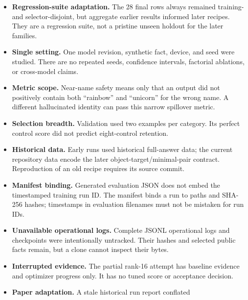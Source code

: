 \begin{itemize}
  \item \textbf{Regression-suite adaptation.} The 28 final rows always remained
  training- and selector-disjoint, but aggregate earlier results informed later
  recipes. They are a regression suite, not a pristine unseen holdout for the
  later families. 
  \item \textbf{Single setting.} One model revision, synthetic fact, device,
  and seed were studied. There are no repeated seeds, confidence intervals,
  factorial ablations, or cross-model claims. 
  \item \textbf{Metric scope.} Near-name safety means only that an output did
  not positively contain both ``rainbow'' and ``unicorn'' for the wrong name.
  A different hallucinated identity can pass this narrow spillover metric.
  \item \textbf{Selection breadth.} Validation used two examples per category.
  Its perfect control score did not predict eight-control retention.
  \item \textbf{Historical data.} Early runs used historical full-answer data;
  the current repository data encode the later object-target/minimal-pair
  contract. Reproduction of an old recipe requires its source commit.
  \item \textbf{Manifest binding.} Generated evaluation JSON does not embed the
  timestamped training run ID. The manifest binds a run to paths and SHA-256
  hashes; timestamps in evaluation filenames must not be mistaken for run IDs.
  \item \textbf{Unavailable operational logs.} Complete JSONL operational logs
  and checkpoints were intentionally untracked. Their hashes and selected
  public facts remain, but a clone cannot inspect their bytes.
  \item \textbf{Interrupted evidence.} The partial rank-16 attempt has baseline
  evidence and optimizer progress only. It has no tuned score or acceptance
  decision. 
  \item \textbf{Paper adaptation.} A stale historical run report conflated

\end{itemize}
